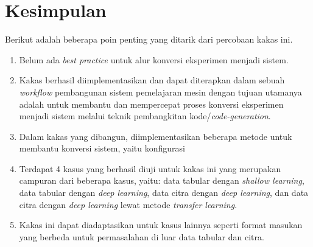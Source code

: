\section{Kesimpulan}

Berikut adalah beberapa poin penting yang ditarik dari percobaan kakas ini.

\begin{enumerate}
    \item Belum ada \textit{best practice} untuk alur konversi eksperimen menjadi sistem.
    \item Kakas  berhasil diimplementasikan dan dapat diterapkan dalam sebuah \textit{workflow} pembangunan sistem pemelajaran mesin dengan tujuan utamanya adalah untuk membantu dan mempercepat proses konversi eksperimen menjadi sistem melalui teknik pembangkitan kode/\textit{code-generation}.
    \item Dalam kakas yang dibangun, diimplementasikan beberapa metode untuk membantu konversi sistem, yaitu konfigurasi
    \item Terdapat 4 kasus yang berhasil diuji untuk kakas ini yang merupakan campuran dari beberapa kasus, yaitu: data tabular dengan \textit{shallow learning}, data tabular dengan \textit{deep learning}, data citra dengan \textit{deep learning}, dan data citra dengan \textit{deep learning} lewat metode \textit{transfer learning}.
    \item Kakas ini dapat diadaptasikan untuk kasus lainnya seperti format masukan yang berbeda untuk permasalahan di luar data tabular dan citra.
\end{enumerate}
